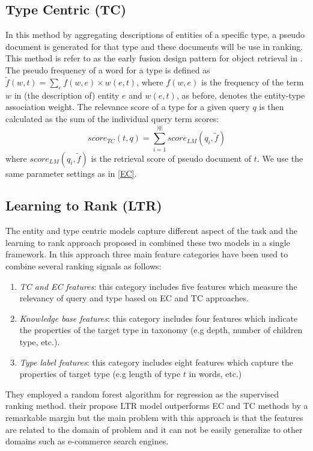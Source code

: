 \subsection{Type Centric (TC)}
In this method by aggregating descriptions of entities of a specific type, a pseudo document is generated for that type and these documents will be use in ranking. This method is refer to as the early fusion design pattern for object retrieval in \cite{zhang2017design}. The pseudo frequency of a word for a type is defined as 
$\tilde{f}(w,t) = \sum_{e}{f(w,e)\times w(e,t)}$, where $f(w,e)$ is the frequency of the term $w$ in (the description of) entity $e$ and $w(e,t)$, as before, denotes the entity-type association weight. The relevance score of a type for a given query $q$ is then calculated as the sum of the individual query term scores:
\begin{equation}
score_{TC}(t,q) = \sum_{i=1}^{|q|}{score_{LM}(q_i,\tilde{f})}
\end{equation}
where $score_{LM}(q_i,\tilde{f})$ is the retrieval score of pseudo document of $t$. We use the same parameter settings as in \ref{EC}.

\subsection{Learning to Rank (LTR)}
The entity and type centric models capture different aspect of the task and the learning to rank approach proposed in \cite{Garigliotti:2017:TTI:3077136.3080659} combined these two models in a single framework. In this approach three main feature categories have been used to combine several ranking signals as follows:
\begin{enumerate}
	\item \textit{TC and EC features}: this category includes five features which measure the relevancy of query and type based on EC and TC approaches.
	\item \textit{Knowledge base features}: this category includes four features which indicate the properties of the target type in taxonomy (e.g depth, number of children type, etc.).
	\item \textit{Type label features}: this category includes eight features which capture the properties of target type (e.g length of type $t$ in words, etc.)
\end{enumerate}
They employed a random forest algorithm for regression as the supervised ranking method. their propose LTR model outperforms EC and TC methods by a remarkable margin but the main problem with this approach is that the features are related to the domain of problem and it can not be easily generalize to other domains such as e-commerce search engines.

